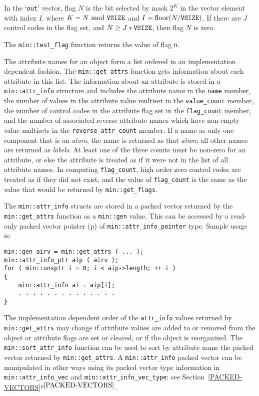 \documentclass[12pt]{article}
\newcommand{\itemref}[1]{\ref{#1}$^{p\pageref{#1}}$}
\newcommand{\pagref}[1]{p\pageref{#1}}
\newcommand{\EOL}{\penalty \exhyphenpenalty}
\newenvironment{indpar}[1][0.3in]%
	{\begin{list}{}%
		     {\setlength{\itemsep}{0in}%
		      \setlength{\topsep}{0in}%
		      \setlength{\parsep}{1ex}%
		      \setlength{\labelwidth}{#1}%
		      \setlength{\leftmargin}{#1}%
		      \addtolength{\leftmargin}{\labelsep}}%
	 \item}%
	{\end{list}}
\begin{document}
In the `{\tt out}' vector, flag $N$ is the bit selected by mask $2^K$
in the vector element with index $I$, where $K=N~\mbox{mod}~\mbox{\tt VSIZE}$
and $I=\mbox{floor}(N/\mbox{\tt VSIZE})$.
If there are $J$ control codes
in the flag set, and $N\geq J*\mbox{\tt VSIZE}$, then
flag $N$ is zero.

The {\tt min::\EOL test\_\EOL flag} function returns the value
of flag {\tt n}.

The attribute names for an object form a list ordered in an implementation
dependent fashion.  
The {\tt min::\EOL get\_\EOL attrs} function gets information about each
attribute in this list.  The information about an attribute is stored in a
{\tt min::\EOL attr\_\EOL info} structure and includes the attribute
name in the {\tt name} member,
the number of values in the attribute value multiset in the {\tt value\_count}
member, the number of control codes in the attribute flag set in
the {\tt flag\_count} member, and the number of associated
reverse attribute names which have non-empty value multisets in the
{\tt reverse\_attr\_count} member.
If a name as only one component that is an {\em atom}, the name is returned
as that {\em atom}; all other names are returned as {\em labels}.
At least one of the three counts must be
non-zero for an attribute, or else the attribute is treated as if it
were not in the list of all attribute names.  In computing
{\tt flag\_count}, high order zero control codes are treated as if they
did not exist, and the value of {\tt flag\_count} is the
same as the value that would be returned by {\tt min::\EOL get\_\EOL flags}.

The {\tt min::\EOL attr\_\EOL info} structs are stored in a packed vector
returned by the {\tt min::\EOL get\_\EOL attrs} function
as a \verb|min::gen| value.  This can be accessed by a read-only
packed vector pointer (\pagref{MIN::PACKED_VEC_PTR_OF_GEN})
of {\tt min::\EOL attr\_\EOL info\_\EOL pointer} type.
Sample usage is:
\begin{indpar}\begin{verbatim}
min::gen airv = min::get_attrs ( ... );
min::attr_info_ptr aip ( airv );
for ( min::unsptr i = 0; i < aip->length; ++ i )
{
    min::attr_info ai = aip[i];
    . . . . . . . . . . . . . .
}
\end{verbatim}\end{indpar}\label{ATTR-INFO-POINTER-EXAMPLE}

The implementation dependent order of the \verb|attr_info|
values returned by {\tt min::\EOL get\_\EOL attrs} may change if attribute
values are added to or removed from the object or
attribute flags are set or cleared, or if the object is reorganized.
The {\tt min::\EOL sort\_\EOL attr\_\EOL info} function can be used
to sort by attribute name
the packed vector returned by {\tt min::\EOL get\_\EOL attrs}.
A {\tt min::\EOL attr\_\EOL info} packed vector can be manipulated in other
ways using its packed vector type information in
{\tt min::\EOL attr\_\EOL info\_\EOL vec}
and {\tt min::\EOL attr\_\EOL info\_\EOL vec\_\EOL type}:
see Section~\itemref{PACKED-VECTORS}.
\end{document}
